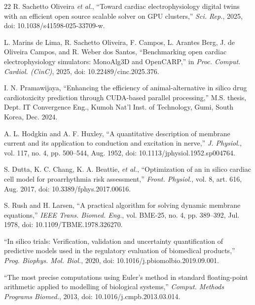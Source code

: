 \documentclass[journal]{IEEEtran}
\begin{document}
\begin{thebibliography}{22}
R. Sachetto Oliveira \emph{et al.}, ``Toward cardiac electrophysiology digital twins with an efficient open source scalable solver on GPU clusters,'' \emph{Sci. Rep.}, 2025, doi: 10.1038/s41598-025-33709-w.

L. Marins de Lima, R. Sachetto Oliveira, F. Campos, L. Arantes Berg, J. de Oliveira Campos, and R. Weber dos Santos, ``Benchmarking open cardiac electrophysiology simulators: MonoAlg3D and OpenCARP,'' in \emph{Proc. Comput. Cardiol. (CinC)}, 2025, doi: 10.22489/cinc.2025.376.

I. N. Pramawijaya, ``Enhancing the efficiency of animal-alternative in silico drug cardiotoxicity prediction through CUDA-based parallel processing,'' M.S. thesis, Dept. IT Convergence Eng., Kumoh Nat'l Inst. of Technology, Gumi, South Korea, Dec. 2024.

A. L. Hodgkin and A. F. Huxley, ``A quantitative description of membrane current and its application to conduction and excitation in nerve,'' \emph{J. Physiol.}, vol. 117, no. 4, pp. 500--544, Aug. 1952, doi: 10.1113/jphysiol.1952.sp004764.

S. Dutta, K. C. Chang, K. A. Beattie, \emph{et al.}, ``Optimization of an in silico cardiac cell model for proarrhythmia risk assessment,'' \emph{Front. Physiol.}, vol. 8, art. 616, Aug. 2017, doi: 10.3389/fphys.2017.00616.

S. Rush and H. Larsen, ``A practical algorithm for solving dynamic membrane equations,'' \emph{IEEE Trans. Biomed. Eng.}, vol. BME-25, no. 4, pp. 389--392, Jul. 1978, doi: 10.1109/TBME.1978.326270.

``In silico trials: Verification, validation and uncertainty quantification of predictive models used in the regulatory evaluation of biomedical products,'' \emph{Prog. Biophys. Mol. Biol.}, 2020, doi: 10.1016/j.pbiomolbio.2019.09.001.

``The most precise computations using Euler's method in standard floating-point arithmetic applied to modelling of biological systems,'' \emph{Comput. Methods Programs Biomed.}, 2013, doi: 10.1016/j.cmpb.2013.03.014.

\end{thebibliography}
\end{document}
